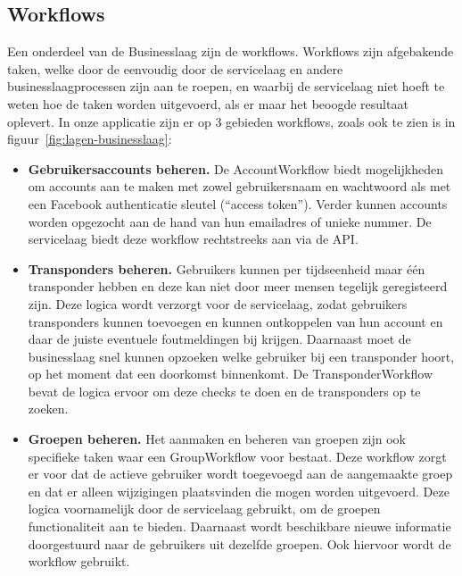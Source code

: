 \subsection{Workflows}

Een onderdeel van de Businesslaag zijn de workflows. Workflows zijn afgebakende taken, 
welke door de eenvoudig door de servicelaag en andere businesslaagprocessen zijn aan te roepen, 
en waarbij de servicelaag niet hoeft te weten hoe de taken worden uitgevoerd, 
als er maar het beoogde resultaat oplevert. In onze applicatie zijn er op 3 gebieden workflows, zoals ook te zien is in figuur~\ref{fig:lagen-businesslaag}:

\begin{itemize}
	\item{\textbf{Gebruikersaccounts beheren.}} 
	De AccountWorkflow biedt mogelijkheden om accounts aan te maken met zowel gebruikersnaam en wachtwoord als met een Facebook authenticatie sleutel (``access token''). Verder kunnen accounts worden opgezocht aan de hand van hun emailadres of unieke nummer. De servicelaag biedt deze workflow rechtstreeks aan via de API.

	\item{\textbf{Transponders beheren.}} 
	Gebruikers kunnen per tijdseenheid maar één transponder hebben en deze kan niet door meer mensen tegelijk geregisteerd zijn. Deze logica wordt verzorgt voor de servicelaag, zodat gebruikers transponders kunnen toevoegen en kunnen ontkoppelen van hun account en daar de juiste eventuele foutmeldingen bij krijgen. Daarnaast moet de businesslaag snel kunnen opzoeken welke gebruiker bij een transponder hoort, op het moment dat een doorkomst binnenkomt. De TransponderWorkflow bevat de logica ervoor om deze checks te doen en de transponders op te zoeken.

	\item{\textbf{Groepen beheren.}} 
	Het aanmaken en beheren van groepen zijn ook specifieke taken waar een GroupWorkflow voor bestaat. Deze workflow zorgt er voor dat de actieve gebruiker wordt toegevoegd aan de aangemaakte groep en dat er alleen wijzigingen plaatsvinden die mogen worden uitgevoerd. Deze logica voornamelijk door de servicelaag gebruikt, om de groepen functionaliteit aan te bieden. Daarnaast wordt beschikbare nieuwe informatie doorgestuurd naar de gebruikers uit dezelfde groepen. Ook hiervoor wordt de workflow gebruikt.

\end{itemize}